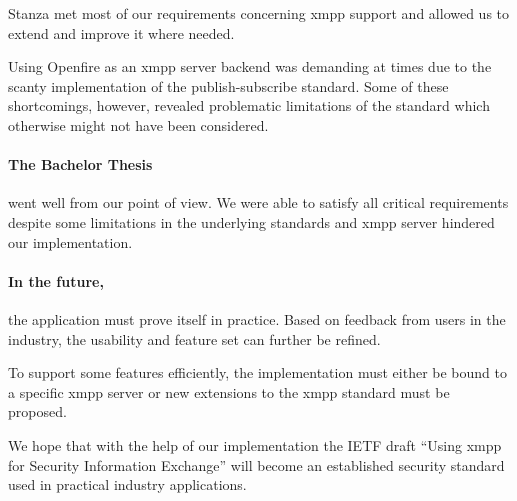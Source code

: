 Stanza met most of our requirements concerning \gls{xmpp} support and allowed us to extend and improve it where needed.

Using Openfire as an \gls{xmpp} server backend was demanding at times due to the scanty implementation of the \gls{publish-subscribe} standard.
Some of these shortcomings, however, revealed problematic limitations of the standard which otherwise might not have been considered.

\paragraph{The Bachelor Thesis} went well from our point of view.
We were able to satisfy all critical requirements despite some limitations in the underlying standards and \gls{xmpp} server hindered our implementation.

\paragraph{In the future,} the application must prove itself in practice.
Based on feedback from users in the industry, the usability and feature set can further be refined.

To support some features efficiently, the implementation must either be bound to a specific \gls{xmpp} server or new extensions to the \gls{xmpp} standard must be proposed.

We hope that with the help of our implementation the IETF draft ``Using \gls{xmpp} for Security Information Exchange'' will become an established security standard used in practical industry applications.
